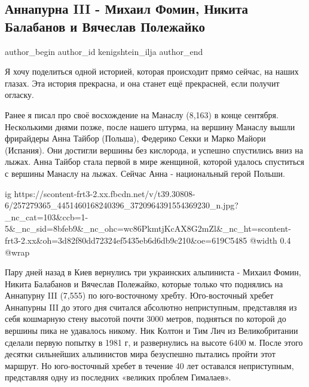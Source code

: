  
 
 
 
 
 
\subsection{Аннапурна III - Михаил Фомин, Никита Балабанов и Вячеслав Полежайко}
\label{sec:14_11_2021.fb.kenigshtein_ilja.1.annapurna_3}
 
\ifcmt
 author_begin
   author_id kenigshtein_ilja
 author_end
\fi

Я хочу поделиться одной историей, которая происходит прямо сейчас, на наших
глазах. Эта история прекрасна, и она станет ещё прекрасней, если получит
огласку. 

Ранее я писал про своё восхождение на Манаслу (8,163) в конце сентября.
Несколькими днями позже, после нашего штурма, на вершину Манаслу вышли
фрирайдеры Анна Тайбор (Польша), Федерико Секки и Марко Майори (Испания). Они
достигли вершины без кислорода, и успешно спустились вниз на лыжах. Анна Тайбор
стала первой в мире женщиной, которой удалось спуститься с вершины Манаслу на
лыжах. Сейчас Анна - национальный герой Польши.

\ifcmt
  ig https://scontent-frt3-2.xx.fbcdn.net/v/t39.30808-6/257279365_4451460168240396_3720964391554369230_n.jpg?_nc_cat=103&ccb=1-5&_nc_sid=8bfeb9&_nc_ohc=wc86PkmtjKcAX8G2mZl&_nc_ht=scontent-frt3-2.xx&oh=3d82f80dd72324ef5435eb6d6db9c210&oe=619C5485
  @width 0.4
  @wrap 
\fi

Пару дней назад в Киев вернулись три украинских альпиниста - Михаил Фомин,
Никита Балабанов и Вячеслав Полежайко, которые только что поднялись на
Аннапурну III (7,555) по юго-восточному хребту. Юго-восточный хребет Аннапурны
III до этого дня считался абсолютно неприступным, представляя из себя кошмарную
стену высотой почти 3000 метров, подняться по которой до вершины пика не
удавалось никому. Ник Колтон и Тим Лич из Великобритании сделали первую попытку
в 1981 г, и развернулись на высоте 6400 м. После этого десятки сильнейших
альпинистов мира безуспешно пытались пройти этот маршрут. Но юго-восточный
хребет в течение 40 лет оставался неприступным, представляя одну из последних
«великих проблем Гималаев».

